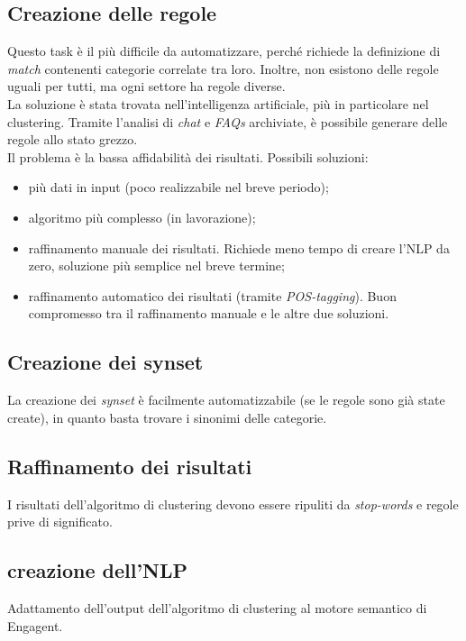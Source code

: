 \subsection{Creazione delle regole}\label{creazione_regole}
Questo task è il più difficile da automatizzare, perché richiede la definizione di \emph{match} contenenti categorie correlate tra loro. Inoltre, non esistono delle regole uguali per tutti, ma ogni settore ha regole diverse.\\
La soluzione è stata trovata nell'intelligenza artificiale, più in particolare nel clustering. Tramite l'analisi di \emph{chat} e \textit{FAQs} archiviate, è possibile generare delle regole allo stato grezzo.\\
Il problema è la bassa affidabilità dei risultati. Possibili soluzioni:
\begin{itemize}
    \item più dati in input (poco realizzabile nel breve periodo);
    \item algoritmo più complesso (in lavorazione);
    \item raffinamento manuale dei risultati. Richiede meno tempo di creare l'NLP da zero, soluzione più semplice nel breve termine; 
    \item raffinamento automatico dei risultati (tramite \emph{POS-tagging}). Buon compromesso tra il raffinamento manuale e le altre due soluzioni.
\end{itemize}

\subsection{Creazione dei synset}
La creazione dei \emph{synset} è facilmente automatizzabile (se le regole sono già state create), in quanto basta trovare i sinonimi delle categorie.

\subsection{Raffinamento dei risultati}
I risultati dell'algoritmo di clustering devono essere ripuliti da \emph{stop-words} e regole prive di significato.

\subsection{creazione dell'NLP}
Adattamento dell'output dell'algoritmo di clustering al motore semantico di Engagent.

